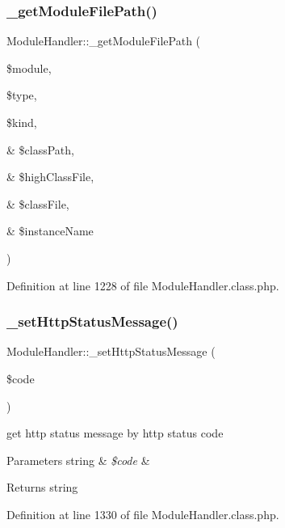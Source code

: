\subsubsection{\texorpdfstring{\+\_\+get\+Module\+File\+Path()}{\_getModuleFilePath()}}
{\footnotesize\ttfamily Module\+Handler\+::\+\_\+get\+Module\+File\+Path (\begin{DoxyParamCaption}\item[{}]{\$module,  }\item[{}]{\$type,  }\item[{}]{\$kind,  }\item[{\&}]{\$class\+Path,  }\item[{\&}]{\$high\+Class\+File,  }\item[{\&}]{\$class\+File,  }\item[{\&}]{\$instance\+Name }\end{DoxyParamCaption})}



Definition at line 1228 of file Module\+Handler.\+class.\+php.

\hypertarget{classModuleHandler_a91c14051caea99153975f2335a2dc770}{}\label{classModuleHandler_a91c14051caea99153975f2335a2dc770} 
\subsubsection{\texorpdfstring{\+\_\+set\+Http\+Status\+Message()}{\_setHttpStatusMessage()}}
{\footnotesize\ttfamily Module\+Handler\+::\+\_\+set\+Http\+Status\+Message (\begin{DoxyParamCaption}\item[{}]{\$code }\end{DoxyParamCaption})}

get http status message by http status code 
\begin{DoxyParams}[1]{Parameters}
string & {\em \$code} & \\
\hline
\end{DoxyParams}
\begin{DoxyReturn}{Returns}
string 
\end{DoxyReturn}


Definition at line 1330 of file Module\+Handler.\+class.\+php.

\hypertarget{classModuleHandler_aa47d0ccb069d65698ade6f44bf6c705f}{}\label{classModuleHandler_aa47d0ccb069d65698ade6f44bf6c705f} 
